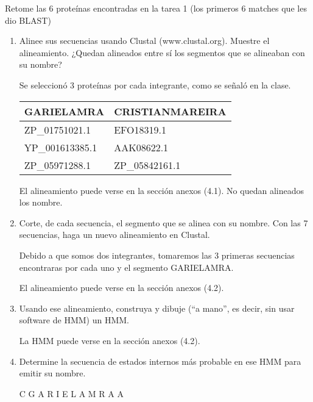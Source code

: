 Retome las 6 proteínas encontradas en la tarea 1 (los primeros 6 matches que les dio BLAST)

\begin{enumerate}
	\item Alinee sus secuencias usando Clustal (www.clustal.org). Muestre el alineamiento. ¿Quedan
		alineados entre sí los segmentos que se alineaban con su nombre?
	

		Se seleccionó 3 proteínas por cada integrante, como se señaló en la clase.

		\begin{tabular}{|l|l|}
			\hline
			GARIELAMRA & CRISTIANMAREIRA \\
			\hline
			ZP\_01751021.1 & EFO18319.1 \\ 
			YP\_001613385.1 & AAK08622.1 \\
			ZP\_05971288.1 & ZP\_05842161.1 \\
			\hline
		\end{tabular}

	El alineamiento puede verse en la sección anexos (4.1).	No quedan alineados los nombre.
			

	\item Corte, de cada secuencia, el segmento que se alinea con su nombre. Con las 7 secuencias,
		haga un nuevo alineamiento en Clustal.


		Debido a que somos dos integrantes, tomaremos las 3 primeras secuencias encontraras por cada uno y el segmento GARIELAMRA.

	El alineamiento puede verse en la sección anexos (4.2).

	\item Usando ese alineamiento, construya y dibuje (“a mano”, es decir, sin usar software de HMM)
		un HMM.


	La HMM puede verse en la sección anexos (4.2).

	\item Determine la secuencia de estados internos más probable en ese HMM para emitir su
		nombre.


		C G A R I E L A M R A A

\end{enumerate}
